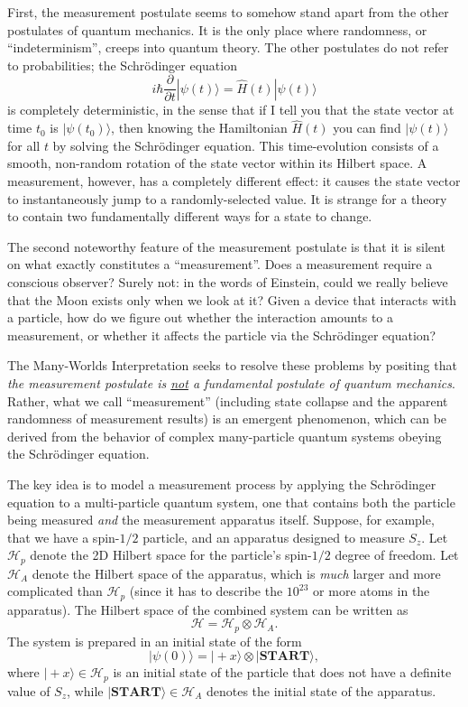 \documentclass[pra,11pt]{revtex4}
\begin{document}
First, the measurement postulate seems to somehow stand apart from the
other postulates of quantum mechanics.  It is the only place where
randomness, or ``indeterminism'', creeps into quantum theory.  The
other postulates do not refer to probabilities; the Schr\"odinger
equation
$$i\hbar\frac{\partial}{\partial t}|\psi(t)\rangle = \hat{H}(t) |\psi(t)\rangle$$
is completely deterministic, in the sense that if I tell you that the
state vector at time $t_0$ is $|\psi(t_0)\rangle$, then knowing the
Hamiltonian $\hat{H}(t)$ you can find $|\psi(t)\rangle$ for all $t$ by
solving the Schr\"odinger equation.  This time-evolution consists of a
smooth, non-random rotation of the state vector within its Hilbert
space.  A measurement, however, has a completely different effect: it
causes the state vector to instantaneously jump to a randomly-selected
value.  It is strange for a theory to contain two fundamentally
different ways for a state to change.

The second noteworthy feature of the measurement postulate is that it
is silent on what exactly constitutes a ``measurement''.  Does a
measurement require a conscious observer?  Surely not: in the words of
Einstein, could we really believe that the Moon exists only when we
look at it?  Given a device that interacts with a particle, how do we
figure out whether the interaction amounts to a measurement, or
whether it affects the particle via the Schr\"odinger equation?

The Many-Worlds Interpretation seeks to resolve these problems by
positing that \textit{the measurement postulate is \underline{not} a
  fundamental postulate of quantum mechanics}.  Rather, what we call
``measurement'' (including state collapse and the apparent randomness
of measurement results) is an emergent phenomenon, which can be
derived from the behavior of complex many-particle quantum systems
obeying the Schr\"odinger equation.

The key idea is to model a measurement process by applying the
Schr\"odinger equation to a multi-particle quantum system, one that
contains both the particle being measured \textit{and} the measurement
apparatus itself.  Suppose, for example, that we have a spin-$1/2$
particle, and an apparatus designed to measure $S_z$.  Let
$\mathscr{H}_p$ denote the 2D Hilbert space for the particle's
spin-$1/2$ degree of freedom.  Let $\mathscr{H}_A$ denote the Hilbert
space of the apparatus, which is \textit{much} larger and more
complicated than $\mathscr{H}_p$ (since it has to describe the
$10^{23}$ or more atoms in the apparatus).  The Hilbert space of the
combined system can be written as
$$\mathscr{H} = \mathscr{H}_p \otimes \mathscr{H}_A.$$
The system is prepared in an initial state of the form
$$|\psi(0)\rangle = |\!+x\rangle \otimes |\textbf{START}\rangle,$$
where $|\!+x\rangle \in \mathscr{H}_p$ is an initial state of the
particle that does not have a definite value of $S_z$, while
$|\textbf{START}\rangle \in \mathscr{H}_A$ denotes the initial state
of the apparatus.
\end{document}
